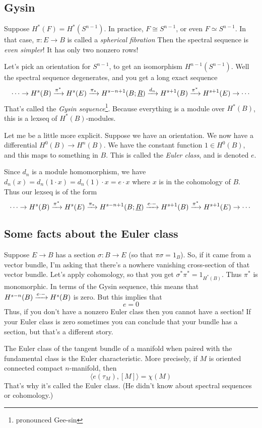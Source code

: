 \subsection{Gysin}

Suppose $H^\ast(F) = H^\ast(S^{n-1})$.
In practice, $F\cong S^{n-1}$, or even $F\simeq S^{n-1}$.
In that case, $\pi:E\to B$ is called a \emph{spherical fibration}
Then the spectral sequence is \emph{even simpler}!
It has only two nonzero rows!

Let's pick an orientation for $S^{n-1}$, to get an isomorphism $H^{n-1}(S^{n-1})$.
Well the spectral sequence degenerates, and you get a long exact sequence
$$
\cdots \to H^s(B) \xrightarrow{{\pi^\ast}} H^s(E) \xrightarrow{{\pi_\ast}} H^{s-n+1}(B;\underline{R}) \xrightarrow{{d_n}} H^{s+1}(B) \xrightarrow{{\pi^\ast}} H^{s+1}(E) \to \cdots
$$
That's called the \emph{Gysin sequence}\footnote{pronounced Gee-sin}.
Because everything is a module over $H^\ast(B)$, this is a lexseq of $H^\ast(B)$-modules.

Let me be a little more explicit.
Suppose we have an orientation.
We now have a differential $H^0(B) \to H^n(B)$.
We have the constant function $1\in H^0(B)$, and this maps to something in $B$.
This is called the \emph{Euler class}, and is denoted $e$.

Since $d_n$ is a module homomorphism, we have $d_n(x) = d_n(1\cdot x) = d_n(1) \cdot x = e \cdot x$ where $x$ is in the cohomology of $B$.
Thus our lexseq is of the form
$$
\cdots \to H^s(B) \xrightarrow{{\pi^\ast}} H^s(E) \xrightarrow{{\pi_\ast}} H^{s-n+1}(B;\underline{R}) \xrightarrow{{e\cdot - }} H^{s+1}(B) \xrightarrow{{\pi^\ast}} H^{s+1}(E) \to \cdots
$$
\subsection{Some facts about the Euler class}
Suppose $E\to B$ has a section $\sigma:B\to E$ (so that $\pi\sigma = 1_B$).
So, if it came from a vector bundle, I'm asking that there's a nowhere vanishing cross-section of that vector bundle.
Let's apply cohomology, so that you get $\sigma^\ast \pi^\ast = 1_{H^\ast(B)}$.
Thus $\pi^\ast$ is monomorphic.
In terms of the Gysin sequence, this means that $H^{s-n}(B)\xrightarrow{{e\cdot -}} H^s(B)$ is zero.
But this implies that
$$\boxed{e = 0}$$
Thus, if you don't have a nonzero Euler class then you cannot have a section!
If your Euler class is zero sometimes you can conclude that your bundle has a section, but that's a different story.

The Euler class of the tangent bundle of a manifold when paired with the fundamental class is the Euler characteristic.
More precisely, if $M$ is oriented connected compact $n$-manifold, then
$$
\langle e(\tau_M), [M] \rangle = \chi(M)
$$
That's why it's called the Euler class.
(He didn't know about spectral sequences or cohomology.)
